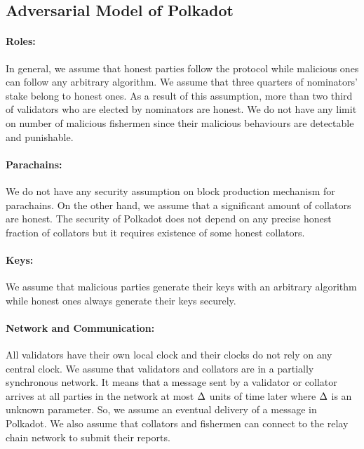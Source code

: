\subsection{Adversarial Model of Polkadot}

\paragraph{Roles:} In general, we assume that honest parties follow the protocol while malicious ones can follow any arbitrary algorithm. We assume that three quarters of nominators' stake belong to honest ones. As a result of this assumption, more than two third of validators who are elected by nominators are honest. We do not have any limit on number of malicious fishermen since their malicious behaviours are detectable and punishable.  

\paragraph{Parachains:} We do not have any security assumption on block production mechanism for parachains. On the other hand, we assume that a significant amount of collators are honest. The security of Polkadot does not depend on any precise honest fraction of collators but it requires existence of some honest collators.

\paragraph{Keys:} We assume that malicious parties generate their keys with an arbitrary algorithm
while honest ones always generate their keys securely. 

\paragraph{Network and Communication:} \label{par:network_coms} All validators have their own local clock and their clocks do not rely on any central clock.
We assume that  validators and collators are in a partially synchronous network.
It means that a message sent by a validator or collator arrives at all parties in the network
at most $\Delta$ units of time later where $\Delta$ is an unknown parameter. So, we assume an eventual delivery of a message in Polkadot.
We also assume that collators and fishermen can connect to the relay chain network to submit their reports.



